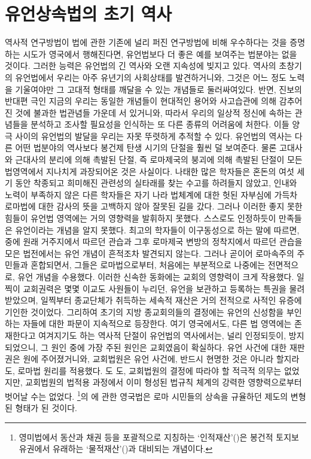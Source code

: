 \chapter{유언상속법의 초기 역사}

역사적 연구방법이
%
법에 관한
기존에 널리 퍼진 연구방법에 비해 우수하다는 것을
증명하는 시도가
영국에서
행해진다면,
유언법보다 더 좋은 예를 보여주는 법분야는 없을 것이다.
그러한 능력은 유언법의 긴 역사와 오랜 지속성에 빚지고 있다.
역사의 초창기의 유언법에서
우리는
아주 유년기의 사회상태를 발견하거니와,
그것은 어느 정도 노력을 기울여야만
그 고대적 형태를 깨달을 수 있는 개념들로 둘러싸여있다.
반면, 진보의 반대편 극인 지금의 우리는
동일한 개념들이
현대적인 용어와 사고습관에 의해 감추어진 것에
불과한
법관념들 가운데 서 있거니와,
따라서
우리의 일상적 정신에 속하는 관념들을 분석하고 조사할 필요성을
인식하는 또 다른 종류의 어려움에 처한다.
이들 양 극 사이의 유언법의 발달을
우리는
자못 뚜렷하게 추적할 수 있다.
유언법의 역사는
다른 어떤 법분야의 역사보다
봉건제 탄생 시기의 단절을 훨씬 덜 보여준다.
물론
고대사와 근대사의 분리에 의해 촉발된 단절,
즉 로마제국의 붕괴에 의해 촉발된 단절이
모든 법영역에서
지나치게 과장되어온 것은 사실이다.
나태한
많은 학자들은
혼돈의 여섯 세기 동안 착종되고 희미해진 관련성의 실타래를
찾는 수고를 하려들지 않았고,
인내와 노력이 부족하지 않은 다른 학자들은
자기 나라 법체계에 대한 헛된 자부심에 가득차
로마법에 대한 감사의 뜻을 고백하지 않아 잘못된 길을 갔다.
그러나 이러한 좋지 못한 힘들이 유언법 영역에는 거의 영향력을 발휘하지 못했다.
스스로도 인정하듯이 만족들은 유언이라는 개념을 알지 못했다.
최고의 학자들이 이구동성으로 하는 말에 따르면,
 중에
원래 거주지에서 따르던 관습과 그후
로마제국 변방의 정착지에서 따르던 관습을 모은 법전에서는
유언 개념이 흔적조차 발견되지 않는다.
그러나 곧이어 로마속주의 주민들과 혼합되면서, 그들은
로마법으로부터, 처음에는 부분적으로 나중에는 전면적으로,
유언 개념을 수용했다.
이러한 신속한 동화에는 교회의 영향력이 크게 작용했다.
일찍이 교회권력은 몇몇 이교도 사원들이 누리던,
유언을 보관하고 등록하는 특권을 물려받았으며,
일찍부터 종교단체가 취득하는 세속적 재산은
거의 전적으로 사적인 유증에 기인한 것이었다.
그리하여 초기의 지방 종교회의들의 결정에는
유언의 신성함을 부인하는 자들에 대한 파문이 지속적으로 등장한다.
여기 영국에서도,
다른 법 영역에는 존재한다고 여겨지기도 하는
역사적 단절이
유언법의 역사에서는, 널리 인정되듯이, 방지되었으니, 그 원인 중에
가장 주된 원인은 교회였음이 확실하다.
유언 사건에 대한 재판권은 원에 주어졌거니와,
교회법원은 유언 사건에, 반드시 현명한 것은 아니라 할지라도, 로마법 원리를 적용했다.
도 도,
교회법원의 결정에 따라야 할 적극적 의무는 없었지만,
교회법원의 법적용 과정에서 이미 형성된 법규칙 체계의 강력한 영향력으로부터
벗어날 수는 없었다.
\footnote{%
  영미법에서 동산과 채권 등을 포괄적으로 지칭하는
  `인적재산'()은
  봉건적 토지보유권에서 유래하는 `물적재산'()과
  대비되는 개념이다.
}의 에 관한 영국법은
로마 시민들의 상속을 규율하던 제도의 변형된 형태가 된 것이다.

